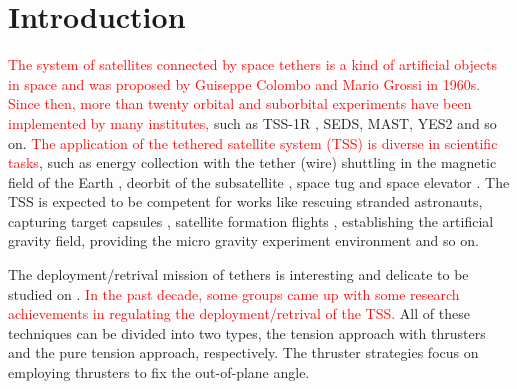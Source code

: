\documentclass[3p]{elsarticle}
\theoremstyle{plain}
\begin{document}
\section{Introduction}
\textcolor{red}{The system of satellites connected by space tethers is a kind of artificial objects in space and was proposed by Guiseppe Colombo and Mario Grossi in 1960s. Since then, more than twenty orbital and suborbital experiments have been implemented by many institutes,} such as TSS-1R \cite{lanoix2005effect}, SEDS, MAST, YES2 \cite{williams2012review} and so on.
\textcolor{red}{The application of the tethered satellite system (TSS) is diverse in scientific tasks}, such as energy collection with the tether (wire) shuttling in the magnetic field of the Earth \cite{lanoix2005effect}, deorbit of the subsatellite \cite{khan2014analysis}, space tug \cite{wen2016constrained} and space elevator \cite{kojima2015mission}. The TSS is expected to be competent for works like rescuing stranded astronauts, capturing target capsules \cite{huang2015adaptive}, satellite formation flights \cite{hallaj2015tethered,alary2015dynamics}, establishing the artificial gravity field, providing the micro gravity experiment environment \cite{chung2007nonlinear} and so on.\par
The deployment/retrival mission of tethers is interesting and delicate to be studied on \cite{Fujii2012Deployment,steindl2014optimal,cai2014deployment,ma2014coordinated,jung2015nonlinear,li2016libration}.
\textcolor{red}{In the past decade, some groups came up with some research achievements in regulating the deployment/retrival of the TSS.}
All of these techniques can be divided into two types, the tension approach with thrusters and the pure tension approach, respectively. The thruster strategies focus on employing thrusters to fix the out-of-plane angle.
\end{document}
